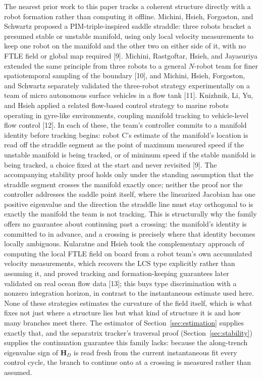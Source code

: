 \documentclass[lettersize,journal]{IEEEtran}
\begin{document}
The nearest prior work to this paper tracks a coherent structure directly
with a robot formation rather than computing it offline. Michini, Hsieh,
Forgoston, and Schwartz proposed a PIM-triple-inspired saddle straddle:
three robots bracket a presumed stable or unstable manifold, using only
local velocity measurements to keep one robot on the manifold and the other
two on either side of it, with no FTLE field or global map required [9].
Michini, Rastgoftar, Hsieh, and Jayasuriya extended the same principle from
three robots to a general $N$-robot team for finer spatiotemporal sampling
of the boundary [10], and Michini, Hsieh, Forgoston, and Schwartz separately
validated the three-robot strategy experimentally on a team of micro
autonomous surface vehicles in a flow tank [11]. Knizhnik, Li, Yu, and Hsieh
applied a related flow-based control strategy to marine robots operating in
gyre-like environments, coupling manifold tracking to vehicle-level flow
control [12]. In each of these, the team's controller commits to a manifold
identity before tracking begins: robot C's estimate of the manifold's
location is read off the straddle segment as the point of maximum measured
speed if the unstable manifold is being tracked, or of minimum speed if the
stable manifold is being tracked, a choice fixed at the start and never
revisited [9]. The accompanying stability proof holds only under the
standing assumption that the straddle segment crosses the manifold exactly
once; neither the proof nor the controller addresses the saddle point
itself, where the linearized Jacobian has one positive eigenvalue and the
direction the straddle line must stay orthogonal to is exactly the
manifold the team is not tracking. This is structurally why the family
offers no guarantee about continuing past a crossing: the manifold's
identity is committed to in advance, and a crossing is precisely where
that identity becomes locally ambiguous. Kularatne and Hsieh took the
complementary approach of computing the local FTLE field on board from a
robot team's own accumulated velocity measurements, which recovers the
LCS type explicitly rather than assuming it, and proved tracking and
formation-keeping guarantees later validated on real ocean flow data [13];
this buys type discrimination with a nonzero integration horizon, in
contrast to the instantaneous estimate used here. None of these strategies
estimates the curvature of the field itself, which is what fixes not just
where a structure lies but what kind of structure it is and how many
branches meet there. The estimator of Section~\ref{sec:estimation} supplies
exactly that, and the separatrix tracker's traversal proof
(Section~\ref{sec:stability}) supplies the continuation guarantee this
family lacks: because the along-trench eigenvalue sign of $\mathbf{H}_D$ is
read fresh from the current instantaneous fit every control cycle, the
branch to continue onto at a crossing is measured rather than assumed.
\end{document}
